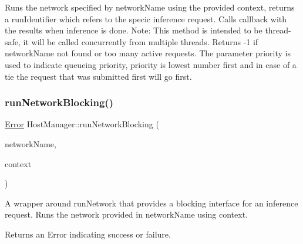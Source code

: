 Runs the network specified by {\ttfamily network\+Name} using the provided {\ttfamily context}, returns a run\+Identifier which refers to the specic inference request. Calls {\ttfamily callback} with the results when inference is done. Note\+: This method is intended to be thread-\/safe, it will be called concurrently from multiple threads. Returns -\/1 if network\+Name not found or too many active requests. The parameter {\ttfamily priority} is used to indicate queueing priority, priority is lowest number first and in case of a tie the request that was submitted first will go first. \mbox{\label{classglow_1_1runtime_1_1_host_manager_a6e65b0b9577ab3573121fd5875514da1}} 
\subsubsection{\texorpdfstring{run\+Network\+Blocking()}{runNetworkBlocking()}\hspace{0.1cm}{\footnotesize\ttfamily [1/2]}}
{\footnotesize\ttfamily \hyperlink{namespaceglow_afdb176c3a672ef66db0ecfc19a8d39bf}{Error} Host\+Manager\+::run\+Network\+Blocking (\begin{DoxyParamCaption}\item[{llvm\+::\+String\+Ref}]{network\+Name,  }\item[{std\+::unique\+\_\+ptr$<$ \hyperlink{classglow_1_1_execution_context}{Execution\+Context} $>$}]{context }\end{DoxyParamCaption})}

A wrapper around run\+Network that provides a blocking interface for an inference request. Runs the network provided in {\ttfamily network\+Name} using {\ttfamily context}. \begin{DoxyReturn}{Returns}
an Error indicating success or failure. 
\end{DoxyReturn}
\mbox{\label{classglow_1_1runtime_1_1_host_manager_a0d6086ba220183342de461d500d6dde4}} 
